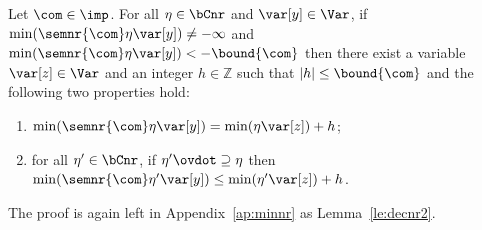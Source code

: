 \begin{lemma}\label{le:decnr}
  Let \(\com\in \imp\).
  For all \(\eta \in \bCnr\) and \(\var[y] \in \Var\), if
  \(\min(\semnr{\com} \eta \var[y]) \neq -\infty\) and
  \(\min(\semnr{\com}\eta \var[y]) < -\bound{\com}\) then there exist
  a variable \(\var[z] \in \Var\) and an integer \(h \in \mathbb{Z}\)
  such that \(|h| \leq \bound{\com}\) and the following two properties
  hold:
  \begin{enumerate}[label=(\roman*)]
  \item\label{point1nrmin} \(\min(\semnr{\com}\eta \var[y]) = \min(\eta \var[z]) + h\); 
  \item\label{point2nrmin} for all \(\eta' \in \bCnr\), if
    \(\eta' \ovdot\supseteq \eta\)
    then
    \(\min(\semnr{\com}\eta' \var[y]) \leq \min(\eta' \var[z]) + h\).
  \end{enumerate}
\end{lemma}

The proof is again left in Appendix~\ref{ap:minnr} as
Lemma~\ref{le:decnr2}.
